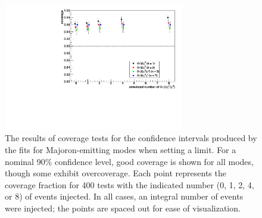 \documentclass[herrin-thesis.tex]{subfiles}
\begin{document}
\begin{figure}[tbp]
\centering
\includegraphics[width=0.7\textwidth]{./plots/analysis_bb0nX_coverage.pdf}
\caption[Coverage tests for \zeronuXpX{}]{The results of coverage tests for the confidence intervals produced by the fits for Majoron-emitting modes when setting a limit. For a nominal 90\% confidence level, good coverage is shown for all modes, though some exhibit overcoverage. Each point represents the coverage fraction for 400 tests with the indicated number (0, 1, 2, 4, or 8) of \zeronuXpX{} events injected. In all cases, an integral number of events were injected; the points are spaced out for ease of visualization.}
\label{fig:analysis_bb0nX_coverage}
\end{figure}
\end{document}
